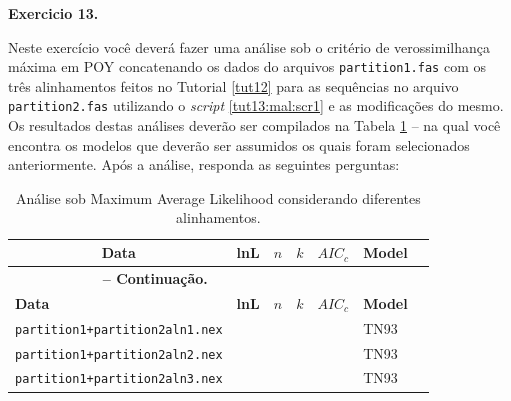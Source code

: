 \begin{refsection}
\begin{blackBlock}{\textbf{Exercicio 13.}}\label{tut13:ex:13.5}

Neste exercício você deverá fazer uma análise sob o critério de verossimilhança máxima em POY concatenando os dados do arquivos \texttt{partition1.fas} com os três alinhamentos feitos no Tutorial \ref{tut12} para as sequências no arquivo \texttt{partition2.fas} utilizando o \textit{script} \ref{tut13:mal:scr1} e as modificações do mesmo. Os resultados destas análises deverão ser compilados na Tabela \ref{tut13:ex:13.5} -- na qual você encontra os modelos que deverão ser assumidos os quais foram selecionados anteriormente. Após a análise, responda as seguintes perguntas:

\end{blackBlock}

\vspace{50pt}
\pagestyle{fancy}
\begin{center}

\begin{longtable}{|l|>{\centering}m{2cm}|>{\centering}m{1cm}|c|>{\centering}m{2cm}|>{\centering}m{2cm} |@{}m{0pt}@{}}
\caption[Análise sob Maximum Average Likelihood.]{Análise sob Maximum Average Likelihood considerando diferentes alinhamentos.} \label{tut13:ex:13.5} \\

\hline\hline  \multicolumn{1}{|c|}{\textbf{Data}} & \textbf{lnL}  & \textbf{$n$} & \textbf{$k$} & \textbf{$AIC_{c}$} & \textbf{Model} &\\
\endfirsthead

\multicolumn{3}{c}{{\bfseries \tablename\ \thetable{} -- Continuação.}}\\
\hline\hline \textbf{Data} & \textbf{lnL}  & \textbf{$n$} & \textbf{$k$} & \textbf{$AIC_{c}$} & \textbf{Model} &\\
\endhead
\hline \hline
\endlastfoot
\hline \scriptsize\texttt{partition1+partition2aln1.nex} & & & & & TN93 &\\
\hline \scriptsize\texttt{partition1+partition2aln2.nex} & & & & & TN93 &\\
\hline \scriptsize\texttt{partition1+partition2aln3.nex} & & & & & TN93 &\\
\end{longtable}
\end{center}




\end{refsection}
